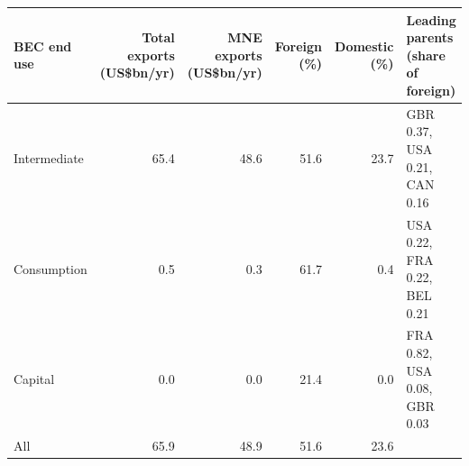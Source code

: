 \begin{tabular}{@{}l r r r r l@{}}
\toprule
BEC end use & Total exports (US\$bn/yr) & MNE exports (US\$bn/yr) & Foreign (\%) & Domestic (\%) & Leading parents (share of foreign) \\
\midrule
Intermediate & 65.4 & 48.6 & 51.6 & 23.7 & GBR 0.37, USA 0.21, CAN 0.16 \\
Consumption & 0.5 & 0.3 & 61.7 & 0.4 & USA 0.22, FRA 0.22, BEL 0.21 \\
Capital & 0.0 & 0.0 & 21.4 & 0.0 & FRA 0.82, USA 0.08, GBR 0.03 \\
\midrule
All & 65.9 & 48.9 & 51.6 & 23.6 & \\
\bottomrule
\end{tabular}
